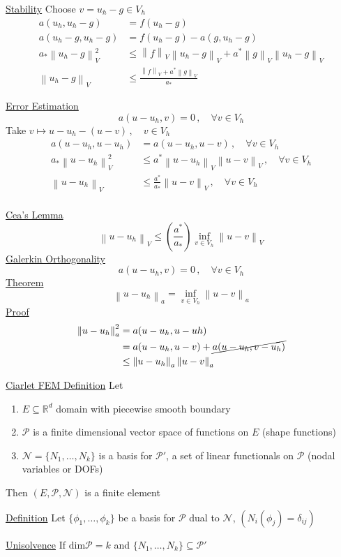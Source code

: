 \documentclass[letterpaper]{article}
\providecommand{\norm}[1]{\left\lVert#1\right\rVert}
\begin{document}
\begin{multicols}{2}
\uline{Stability} Choose $v=u_h-g\in V_h$
\begin{align*}
a(u_h,u_h-g)&=f(u_h-g)\\
a(u_h-g,u_h-g)&=f(u_h-g)-a(g,u_h-g)\\
a_*\norm{u_h-g}_V^2&\le\norm{f}_V\norm{u_h-g}_V+a^*\norm{g}_V\norm{u_h-g}_V\\
\norm{u_h-g}_V&\le\frac{\norm{f}_V+a^*\norm{g}_V}{a_*}
\end{align*}

\uline{Error Estimation} 
\[
a(u-u_h,v)=0\,,\quad\forall v\in V_h
\]
Take $v\mapsto u-u_h-(u-v)\,,\quad v\in V_h$
\begin{align*}
a(u-u_h,u-u_h)&=a(u-u_h,u-v)\,,\quad\forall v\in V_h\\
a_*\norm{u-u_h}_V^2&\le a^*\norm{u-u_h}_V\norm{u-v}_V\,,\quad\forall v\in V_h\\
\norm{u-u_h}_V&\le\frac{a^*}{a_*}\norm{u-v}_V\,,\quad\forall v\in V_h\\
\end{align*}

\uline{Cea's Lemma} 
\[
\norm{u-u_h}_V\le\left(\frac{a^*}{a_*}\right)\inf_{v\in V_h}\norm{u-v}_V
\]
\uline{Galerkin Orthogonality}
\[
a(u-u_h,v)=0\,,\quad\forall v\in V_h
\]
\uline{Theorem}
\[
\norm{u-u_h}_a=\inf_{v\in V_h}\norm{u-v}_a
\]
\uline{Proof}
\begin{align*}
\norm{u-u_h}_a^2&=a(u-u_h,u-uh)\\
&=a(u-u_h,u-v)+\cancel{a(u-u_h,v-u_h)}\\
&\le\norm{u-u_h}_a\norm{u-v}_a
\end{align*}

\uline{Ciarlet FEM Definition} Let
\begin{enumerate}
\item $E\subseteq\mathbb{R}^d$ domain with piecewise smooth boundary
\item $\mathcal{P}$ is a finite dimensional vector space of functions on $E$
(shape functions)
\item $\mathcal{N}=\{N_1,\dots,N_k\}$ is a basis for $\mathcal{P}'$, a set of
linear functionals on $\mathcal{P}$ (nodal variables or DOFs)
\end{enumerate}
Then $(E,\mathcal{P},\mathcal{N})$ is a finite element

\uline{Definition} Let $\{\phi_1,\dots,\phi_k\}$ be a basis for $\mathcal{P}$
dual to $\mathcal{N}$, $(N_i(\phi_j)=\delta_{ij})$

\uline{Unisolvence} If $\mathrm{dim}\mathcal{P}=k$ and
$\{N_1,\dots,N_k\}\subseteq\mathcal{P}'$


\end{multicols}
\end{document}
